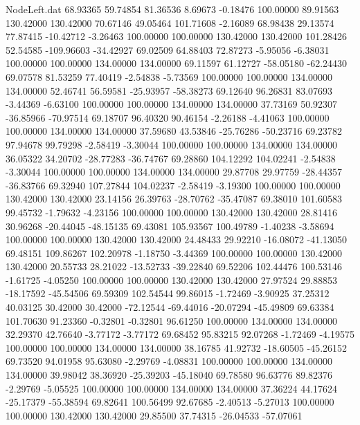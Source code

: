 \begin{filecontents}{NodeLeft.dat}
  68.93365   59.74854   81.36536     8.69673   -0.18476  100.00000   89.91563  130.42000  130.42000   70.67146   49.05464  101.71608   -2.16089
  68.98438   29.13574   77.87415   -10.42712   -3.26463  100.00000  100.00000  130.42000  130.42000  101.28426   52.54585 -109.96603  -34.42927
  69.02509   64.88403   72.87273    -5.95056   -6.38031  100.00000  100.00000  134.00000  134.00000   69.11597   61.12727  -58.05180  -62.24430
  69.07578   81.53259   77.40419    -2.54838   -5.73569  100.00000  100.00000  134.00000  134.00000   52.46741   56.59581  -25.93957  -58.38273
  69.12640   96.26831   83.07693    -3.44369   -6.63100  100.00000  100.00000  134.00000  134.00000   37.73169   50.92307  -36.85966  -70.97514
  69.18707   96.40320   90.46154    -2.26188   -4.41063  100.00000  100.00000  134.00000  134.00000   37.59680   43.53846  -25.76286  -50.23716
  69.23782   97.94678   99.79298    -2.58419   -3.30044  100.00000  100.00000  134.00000  134.00000   36.05322   34.20702  -28.77283  -36.74767
  69.28860  104.12292  104.02241    -2.54838   -3.30044  100.00000  100.00000  134.00000  134.00000   29.87708   29.97759  -28.44357  -36.83766
  69.32940  107.27844  104.02237    -2.58419   -3.19300  100.00000  100.00000  130.42000  130.42000   23.14156   26.39763  -28.70762  -35.47087
  69.38010  101.60583   99.45732    -1.79632   -4.23156  100.00000  100.00000  130.42000  130.42000   28.81416   30.96268  -20.44045  -48.15135
  69.43081  105.93567  100.49789    -1.40238   -3.58694  100.00000  100.00000  130.42000  130.42000   24.48433   29.92210  -16.08072  -41.13050
  69.48151  109.86267  102.20978    -1.18750   -3.44369  100.00000  100.00000  130.42000  130.42000   20.55733   28.21022  -13.52733  -39.22840
  69.52206  102.44476  100.53146    -1.61725   -4.05250  100.00000  100.00000  130.42000  130.42000   27.97524   29.88853  -18.17592  -45.54506
  69.59309  102.54544   99.86015    -1.72469   -3.90925   37.25312   40.03125   30.42000   30.42000  -72.12544  -69.44016  -20.07294  -45.49809
  69.63384  101.70630   91.23360    -0.32801   -0.32801   96.61250  100.00000  134.00000  134.00000   32.29370   42.76640   -3.77172   -3.77172
  69.68452   95.83215   92.07268    -1.72469   -4.19575  100.00000  100.00000  134.00000  134.00000   38.16785   41.92732  -18.60505  -45.26152
  69.73520   94.01958   95.63080    -2.29769   -4.08831  100.00000  100.00000  134.00000  134.00000   39.98042   38.36920  -25.39203  -45.18040
  69.78580   96.63776   89.82376    -2.29769   -5.05525  100.00000  100.00000  134.00000  134.00000   37.36224   44.17624  -25.17379  -55.38594
  69.82641  100.56499   92.67685    -2.40513   -5.27013  100.00000  100.00000  130.42000  130.42000   29.85500   37.74315  -26.04533  -57.07061

\end{filecontents}
